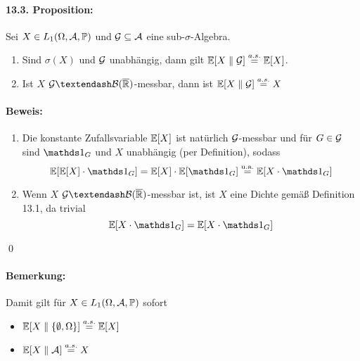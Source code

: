 \documentclass[11pt]{report}
\begin{document}
     \paragraph{13.3. Proposition:}Sei $X\in L_1(\Omega, \mathcal{A}, \mathbb{P})$ und $\mathcal{G}\subseteq\mathcal{A}$ eine sub-$\sigma$-Algebra.
     \begin{enumerate}[label=(\roman*)]
         \item Sind $\sigma(X)$ und $\mathcal{G}$ unabh\"angig, dann gilt $\mathbb{E}[X\parallel\mathcal{G}]\overset{a.s.}{=}\mathbb{E} [X]$.
         \item Ist $X$ $\G\textendash\mathcal{B}(\overline\R)$-messbar, dann ist $\mathbb{E}[X\parallel\mathcal{G}]\overset{a.s.}{=}X$
     \end{enumerate}
     
     \paragraph{Beweis:}
     \begin{enumerate}[label=(\roman*)]
         \item Die konstante Zufallsvariable $\mathbb{E} [X]$ ist nat\"urlich $\mathcal{G}$-messbar und f\"ur $G\in\mathcal{G}$ sind $\ind{G}$ und $X$ unabh\"angig (per Definition), sodass
         $$\E[\E[X]\cdot\ind{G}]=\E [X]\cdot\E[\ind G]\overset{\text{u.a.}}{=}\E[X\cdot\ind{G}]$$
         \item Wenn $X$ $\G\textendash\mathcal{B}(\overline\R)$-messbar ist, ist $X$ eine Dichte gem\"a\ss{} Definition 13.1, da trivial
         $$\E[X\cdot\ind{G}]=\E[X\cdot\ind{G}]$$
     \end{enumerate}
     \qed
     
     \paragraph{Bemerkung:}Damit gilt f\"ur $X\in L_1(\Omega, \mathcal{A}, \mathbb{P})$ sofort
     \begin{itemize}
         \item $\mathbb{E}[X\parallel\{\emptyset,\Omega\}]\overset{a.s.}{=}\mathbb{E}[X]$
         \item $\mathbb{E}[X\parallel\mathcal{A}]\overset{a.s.}{=}X$
     \end{itemize}
     
\end{document}
